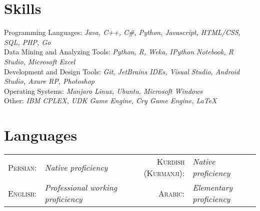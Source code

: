 \documentclass[a4paper,10pt]{article}
\begin{document}
	\section{Skills}
		\textbullet\textnormal{ Programming Languages:}  \emph{\color{darkgray}\small Java, C++, {C\#}, Python, Javascript, HTML/CSS, SQL, PHP, Go}   \vspace{1 mm}  \\
		\textbullet\textnormal{ Data Mining and Analyzing Tools:} \emph{\color{darkgray}\small  Python, R, Weka, IPython Notebook, R Studio, Microsoft Excel} \vspace{1 mm} \\
		\textbullet\textnormal{ Development and Design Tools:} \emph{\color{darkgray}\small Git, JetBrains IDEs, Visual Studio, Android Studio, Axure RP, Photoshop}\vspace{1 mm} \\
		\textbullet\textnormal{ Operating Systems:} \emph{\color{darkgray}\small Manjaro Linux, Ubuntu, Microsoft Windows} \vspace{1 mm} \\
		\textbullet\textnormal{ Other:} \emph{\color{darkgray}\small IBM CPLEX, UDK Game Engine, Cry Game Engine, {\fb \LaTeX}\setmainfont[SmallCapsFont=Fontin-SmallCaps.otf]{Fontin.otf}}	

	\section{Languages}
		\begin{tabular}{rl | rl}
			\textsc{ Persian:}&\emph{\color{darkgray}Native proficiency}& \textsc{ Kurdish (Kurmanji):}&\emph{\color{darkgray}Native proficiency}\\
			\textsc{ English:}&\emph{\color{darkgray}Professional working proficiency} & \textsc{ Arabic:}&\emph{\color{darkgray}Elementary proficiency}
		\end{tabular}
\end{document}
